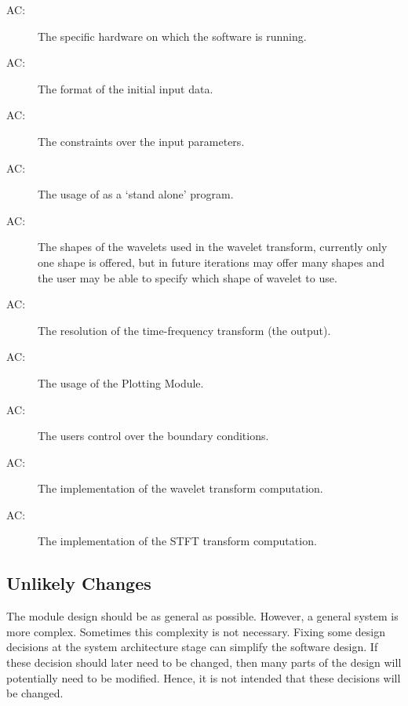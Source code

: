 \documentclass[12pt, titlepage]{article}
\newcounter{acnum}
\newcommand{\actheacnum}{AC\theacnum}
\begin{document}
\begin{description}
\item[ \actheacnum \label{acHardware}:] The specific
  hardware on which the software is running.
\item[ \actheacnum \label{acInput}:] The format of the
  initial input data.
\item[ \actheacnum \label{acInputConstraints}:] The constraints over the input parameters.
\item[ \actheacnum \label{acUseage}:] The usage of \progname{} as a `stand alone' program.
\item[ \actheacnum \label{acWavelet}:] The shapes of the wavelets used in the wavelet transform, currently only one shape is offered, but in future iterations may offer many shapes and the user may be able to specify which shape of wavelet to use. 
\item[ \actheacnum \label{acResolution}:] The resolution of the time-frequency transform (the output). 
\item[ \actheacnum \label{acPlotting}:] The usage of the Plotting Module.
\item[ \actheacnum \label{acBoundrycondtion}:] The users control over the boundary conditions.
\item[ \actheacnum \label{acImpWavelet}:] The implementation of the wavelet transform computation. 
\item[ \actheacnum \label{acImpSTFT}:] The implementation of the STFT transform computation. 
\end{description}

\subsection{Unlikely Changes} \label{SecUchange}

The module design should be as general as possible. However, a general system is
more complex. Sometimes this complexity is not necessary. Fixing some design
decisions at the system architecture stage can simplify the software design. If
these decision should later need to be changed, then many parts of the design
will potentially need to be modified. Hence, it is not intended that these
decisions will be changed.
\end{document}

